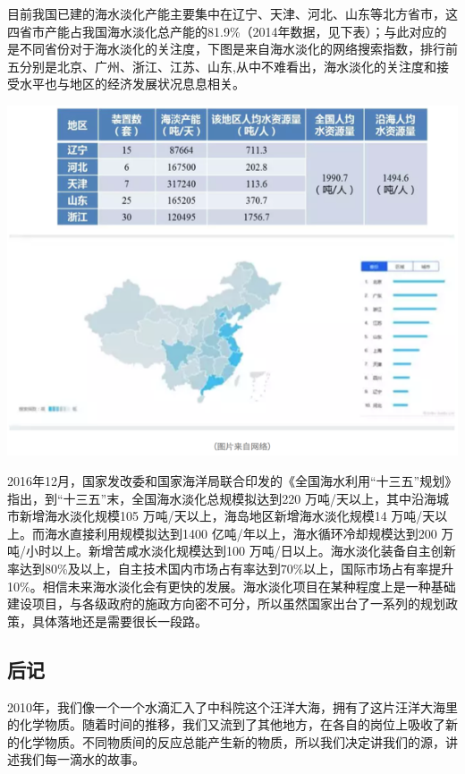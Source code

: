 \documentclass[]{book}
\begin{document}
目前我国已建的海水淡化产能主要集中在辽宁、天津、河北、山东等北方省市，这四省市产能占我国海水淡化总产能的81.9\%（2014年数据，见下表）；与此对应的是不同省份对于海水淡化的关注度，下图是来自海水淡化的网络搜索指数，排行前五分别是北京、广州、浙江、江苏、山东,从中不难看出，海水淡化的关注度和接受水平也与地区的经济发展状况息息相关。

\includegraphics[width=8.33in]{images/seawater5}

2016年12月，国家发改委和国家海洋局联合印发的《全国海水利用``十三五''规划》指出，到``十三五''末，全国海水淡化总规模拟达到220 万吨/天以上，其中沿海城市新增海水淡化规模105 万吨/天以上，海岛地区新增海水淡化规模14 万吨/天以上。而海水直接利用规模拟达到1400 亿吨/年以上，海水循环冷却规模达到200 万吨/小时以上。新增苦咸水淡化规模达到100 万吨/日以上。海水淡化装备自主创新率达到80\%及以上，自主技术国内市场占有率达到70\%以上，国际市场占有率提升10\%。相信未来海水淡化会有更快的发展。海水淡化项目在某种程度上是一种基础建设项目，与各级政府的施政方向密不可分，所以虽然国家出台了一系列的规划政策，具体落地还是需要很长一段路。

\hypertarget{ux540eux8bb0}{%
\subsection{后记}\label{ux540eux8bb0}}

2010年，我们像一个一个水滴汇入了中科院这个汪洋大海，拥有了这片汪洋大海里的化学物质。随着时间的推移，我们又流到了其他地方，在各自的岗位上吸收了新的化学物质。不同物质间的反应总能产生新的物质，所以我们决定讲我们的源，讲述我们每一滴水的故事。
\end{document}
